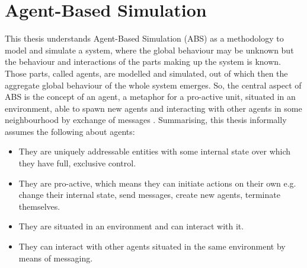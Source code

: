 \section{Agent-Based Simulation}
\label{sec:method_abs}


This thesis understands Agent-Based Simulation (ABS) as a methodology to model and simulate a system, where the global behaviour may be unknown but the behaviour and interactions of the parts making up the system is known. Those parts, called agents, are modelled and simulated, out of which then the aggregate global behaviour of the whole system emerges. So, the central aspect of ABS is the concept of an agent, a metaphor for a pro-active unit, situated in an environment, able to spawn new agents and interacting with other agents in some neighbourhood by exchange of messages \cite{macal_everything_2016, odell_objects_2002, siebers_introduction_2008, wooldridge_introduction_2009}. Summarising, this thesis informally assumes the following about agents:

\begin{itemize}
	\item They are uniquely addressable entities with some internal state over which they have full, exclusive control.
	\item They are pro-active, which means they can initiate actions on their own e.g. change their internal state, send messages, create new agents, terminate themselves.
	\item They are situated in an environment and can interact with it.
	\item They can interact with other agents situated in the same environment by means of messaging.
\end{itemize} 

